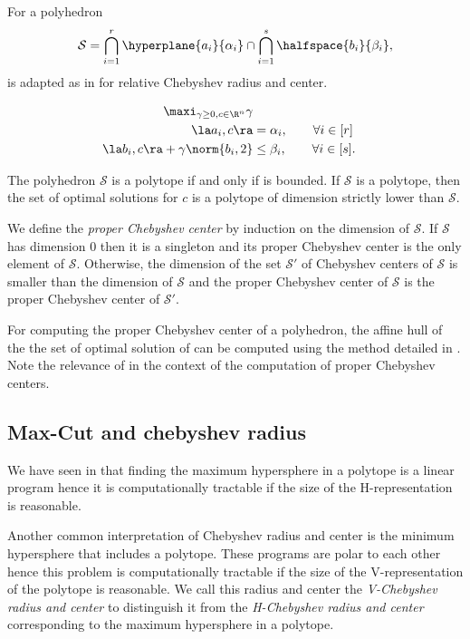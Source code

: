 \documentclass[11pt,twoside,a4paper,openright]{uclouvain-thesis}
\newcommand{\eqnum}{r}
\newcommand{\ineqnum}{s}
\begin{document}
For a polyhedron
\[ \mathcal{S} =
\bigcap_{i=1}^{\eqnum} \hyperplane{a_i}{\alpha_i}
\cap
\bigcap_{i=1}^{\ineqnum} \halfspace{b_i}{\beta_i}, \]
 is adapted as in  for relative Chebyshev radius and center.
\begin{myprog}
\begin{align}
  \notag
  \maxi_{\gamma \ge 0, c \in \R^n} \gamma\\
  \notag
  \la a_i, c \ra & = \alpha_i, \qquad \forall i \in [\eqnum]\\
  \notag
  \la b_i, c \ra + \gamma \norm{b_i, 2} & \le \beta_i, \qquad \forall i \in [\ineqnum].
\end{align}
  \label{prog:chebypoly}
\end{myprog}
The polyhedron $\mathcal{S}$ is a polytope if and only if  is bounded.
If $\mathcal{S}$ is a polytope, then
the set of optimal solutions for $c$ is a polytope of dimension strictly lower than $\mathcal{S}$.

We define the \emph{proper Chebyshev center} by induction on the dimension of $\mathcal{S}$.
If $\mathcal{S}$ has dimension 0 then it is a singleton and its proper Chebyshev center
  is the only element of $\mathcal{S}$.
Otherwise, the dimension of the set $\mathcal{S}'$ of Chebyshev centers of $\mathcal{S}$ is smaller than
the dimension of $\mathcal{S}$ and the proper Chebyshev center of $\mathcal{S}$ is the proper Chebyshev center of $\mathcal{S}'$.

For computing the proper Chebyshev center of a polyhedron,
the affine hull of the
the set of optimal solution of  can be computed using
the method detailed in .
Note the relevance of  in the context of the computation of
proper Chebyshev centers.

\subsection{Max-Cut and chebyshev radius}
\label{sec:maxcut}

We have seen in  that finding the maximum hypersphere in a polytope
is a linear program hence it is computationally tractable if the size of the
H-representation is reasonable.

Another common interpretation of Chebyshev radius and center is the minimum
hypersphere that includes a polytope. These programs are polar to each other
hence this problem is computationally tractable if the size of the V-representation of the
polytope is reasonable.
We call this radius and center the \emph{V-Chebyshev radius and center} to distinguish
it from the \emph{H-Chebyshev radius and center} corresponding to the maximum
hypersphere in a polytope.
\end{document}
